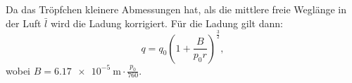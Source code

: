 Da das Tröpfchen kleinere Abmessungen hat, als die mittlere
freie Weglänge in der Luft $\bar{l}$ wird die Ladung korrigiert.
Für die Ladung gilt dann:
\begin{equation}
  q = q_0 \left( 1 + \frac{B}{p_0 r} \right)^{\frac{3}{2}},
  \label{eqn:cunningham}
\end{equation}
wobei $B = \SI{6.17e-5}{\meter} \cdot \frac{p_0}{760}$.
